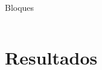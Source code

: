\documentclass[15pt]{beamer} %
\begin{document}
\begin{frame}{Bloques}
\begin{columns}
  \end{columns}
\end{frame}

\section{Resultados}
\end{document}

